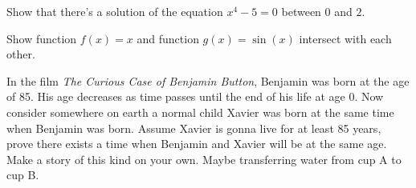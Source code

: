 \documentclass[Calculus 1 Recitation.tex]{subfiles}
\begin{document}
\begin{myleftlinebox}
	Show that there's a solution of the equation $x^4-5=0$ between $0$ and $2$.
	\tcblower
	\vspace{2em}
\end{myleftlinebox}

\begin{myleftlinebox}
	Show function $f(x)=x$ and function $g(x)=\sin(x)$ intersect with each other.
	\tcblower
	\vspace{2em}
\end{myleftlinebox}

\begin{myleftlinebox}
	In the film \emph{The Curious Case of Benjamin Button}, Benjamin was born at the age of 85. His age decreases as time passes until the end of his life at age 0. Now consider somewhere on earth a normal child Xavier was born at the same time when Benjamin was born. Assume Xavier is gonna live for at least 85 years, prove there exists a time when Benjamin and Xavier will be at the same age. Make a story of this kind on your own. Maybe transferring water from cup A to cup B.
	\tcblower
	\vspace{2em}
\end{myleftlinebox}
\end{document}
